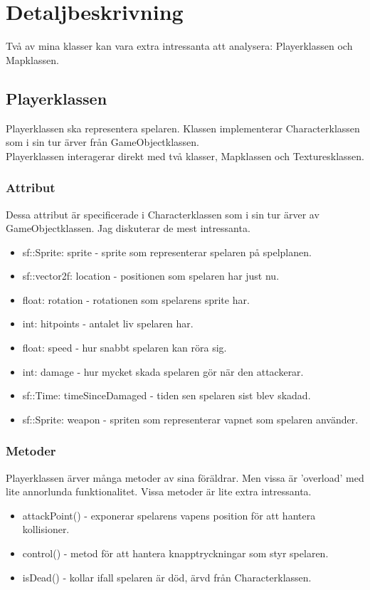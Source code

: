\documentclass{TDP005mall}
\begin{document}
\section{Detaljbeskrivning}
Två av mina klasser kan vara extra intressanta att analysera: Playerklassen och Mapklassen.

\subsection{Playerklassen}
Playerklassen ska representera spelaren. Klassen implementerar Characterklassen som i sin tur ärver från GameObjectklassen. \\
Playerklassen interagerar direkt med två klasser, Mapklassen och Texturesklassen. 
\subsubsection{Attribut}
Dessa attribut är specificerade i Characterklassen som i sin tur ärver av GameObjectklassen.
Jag diskuterar de mest intressanta.
\begin{itemize}
  \item sf::Sprite: sprite - sprite som representerar spelaren på spelplanen.
  \item sf::vector2f: location - positionen som spelaren har just nu.
  \item float: rotation - rotationen som spelarens sprite har.
  \item int: hitpoints - antalet liv spelaren har.
  \item float: speed - hur snabbt spelaren kan röra sig.
  \item int: damage - hur mycket skada spelaren gör när den attackerar.
  \item sf::Time: timeSinceDamaged - tiden sen spelaren sist blev skadad.
  \item sf::Sprite: weapon - spriten som representerar vapnet som spelaren använder.
\end{itemize}
\subsubsection{Metoder}
Playerklassen ärver många metoder av sina föräldrar. Men vissa är 'overload' med lite annorlunda funktionalitet.
Vissa metoder är lite extra intressanta.
\begin{itemize}
  \item attackPoint() - exponerar spelarens vapens position för att hantera kollisioner.
  \item control() - metod för att hantera knapptryckningar som styr spelaren.
  \item isDead() - kollar ifall spelaren är död, ärvd från Characterklassen.
\end{itemize}
\end{document}
